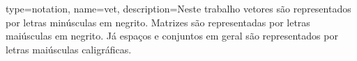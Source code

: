
{
	type=notation,
	name=vet,
	description={Neste trabalho vetores são representados por letras minúsculas em
		negrito. Matrizes são representadas por letras maiúsculas em negrito.
		Já espaços e conjuntos em geral são representados por letras maiúsculas
		caligráficas.}
}





 
